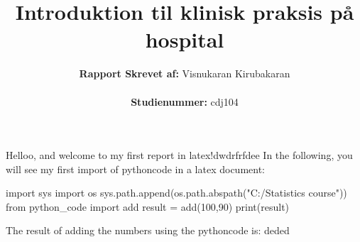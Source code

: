 \documentclass{article}
\title{Introduktion til klinisk praksis på hospital}
\author{\textbf{Rapport
Skrevet af:} Visnukaran Kirubakaran
\noindent
\\
\\
\textbf{Studienummer:} cdj104}
\begin{document}
\maketitle
\noindent
Helloo, and welcome to my first report in latex!dwdrfrfdee
\noindent 
In the following, you will see my first import of pythoncode in a latex document:
\noindent
\begin{pycode}
import sys
import os
sys.path.append(os.path.abspath("C:/Statistics course"))
from python_code import add
result = add(100,90)
print(result)
\end{pycode}
\noindent
The result of adding the numbers using the pythoncode is: 
deded
\end{document}
